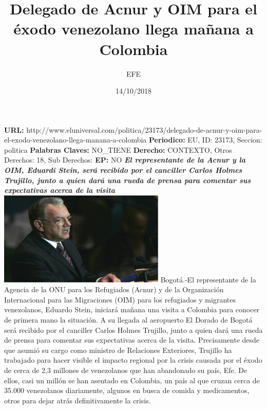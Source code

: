 \documentclass{article}%
\title{\textbf{Delegado de Acnur y OIM para el éxodo venezolano llega mañana a Colombia}}%
\author{EFE}%
\date{14/10/2018}%
\begin{document}
%
\normalsize%
\maketitle%
\textbf{URL: }%
http://www.eluniversal.com/politica/23173/delegado{-}de{-}acnur{-}y{-}oim{-}para{-}el{-}exodo{-}venezolano{-}llega{-}manana{-}a{-}colombia\newline%
%
\textbf{Periodico: }%
EU, %
ID: %
23173, %
Seccion: %
politica\newline%
%
\textbf{Palabras Claves: }%
NO\_TIENE\newline%
%
\textbf{Derecho: }%
CONTEXTO, %
Otros Derechos: %
18, %
Sub Derechos: %
\newline%
%
\textbf{EP: }%
NO\newline%
\newline%
%
\textbf{\textit{El representante de la Acnur y la OIM, Eduardi Stein, será recibido por el canciller Carlos Holmes Trujillo, junto a quien dará una rueda de prensa para comentar sus expectativas acerca de la visita}}%
\newline%
\newline%
%
\includegraphics[width=300px]{76.jpg}%
\newline%
%
Bogotá.{-}El representante de la Agencia de la ONU para los Refugiados (Acnur) y de la Organización Internacional para las Migraciones (OIM) para los refugiados y migrantes venezolanos, Eduardo Stein, iniciará mañana una visita a Colombia para conocer de primera mano la situación.%
\newline%
%
A su llegada al aeropuerto El Dorado de Bogotá será recibido por el canciller Carlos Holmes Trujillo, junto a quien dará una rueda de prensa para comentar sus expectativas acerca de la visita.%
\newline%
%
Precisamente desde que asumió su cargo como ministro de Relaciones Exteriores, Trujillo ha trabajado para hacer visible el impacto regional por la crisis causada por el éxodo de cerca de 2,3 millones de venezolanos que han abandonado su país, Efe.%
\newline%
%
De ellos, casi un millón se han asentado en Colombia, un país al que cruzan cerca de 35.000 venezolanos diariamente, algunos en busca de comida y medicamentos, otros para dejar atrás definitivamente la crisis.%
\end{document}
